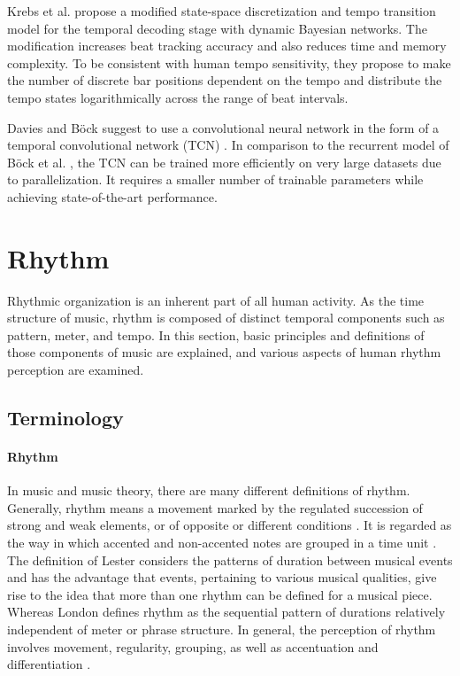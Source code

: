 \documentclass{scrartcl}
\begin{document}
Krebs et al. \cite{Krebs2015} propose a modified state-space discretization and tempo transition model for the temporal decoding stage with dynamic Bayesian networks. The modification increases beat tracking accuracy and also reduces time and memory complexity. To be consistent with human tempo sensitivity, they propose to make the number of discrete bar positions dependent on the tempo and distribute the tempo states logarithmically across the range of beat intervals. 

Davies and Böck \cite{Davies2019} suggest to use a convolutional neural network in the form of a temporal convolutional network (TCN) \cite{Bai2018}. In comparison to the recurrent model of Böck et al. \cite{Boeck2014}, the TCN can be trained more efficiently on very large datasets due to parallelization. It requires a smaller number of trainable parameters while achieving state-of-the-art performance. 



\newpage
\section{Rhythm}
\label{sec:rhyhtm}

Rhythmic organization is an inherent part of all human activity. As the time structure of music, rhythm is composed of distinct temporal components such as pattern, meter, and tempo. In this section, basic principles and definitions of those components of music are explained, and various aspects of human rhythm perception are examined.  


\subsection{Terminology}

\paragraph{Rhythm} 
In music and music theory, there are many different definitions of rhythm. Generally, rhythm means a movement marked by the regulated succession of strong and weak elements, or of opposite or different conditions \cite{Dictionary1971}. It is regarded as the way in which accented and non-accented notes are grouped in a time unit \cite{Cooper1966}. The definition of Lester \cite{Lester1986} considers the patterns of duration between musical events and has the advantage that events, pertaining to various musical qualities, give rise to the idea that more than one rhythm can be defined for a musical piece. Whereas London \cite{London2001} defines rhythm as the sequential pattern of durations relatively independent of meter or phrase structure. In general, the perception of rhythm involves movement, regularity, grouping, as well as accentuation and differentiation \cite{Handel1989}.
\end{document}
